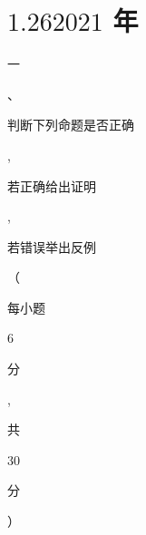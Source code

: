 \documentclass[10pt]{article}
\begin{document}
\section{$1.262021$ 年}
\begin{CJK}{UTF8}{mj}一\end{CJK}、\begin{CJK}{UTF8}{mj}判断下列命题是否正确\end{CJK}, \begin{CJK}{UTF8}{mj}若正确给出证明\end{CJK}, \begin{CJK}{UTF8}{mj}若错误举出反例\end{CJK}（\begin{CJK}{UTF8}{mj}每小题\end{CJK} 6 \begin{CJK}{UTF8}{mj}分\end{CJK}, \begin{CJK}{UTF8}{mj}共\end{CJK} 30 \begin{CJK}{UTF8}{mj}分\end{CJK}）
\end{document}
